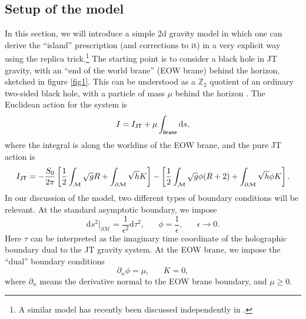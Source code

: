 \documentclass[11pt]{article}
\newcommand{\be}{\begin{equation}}
\newcommand{\ee}{\end{equation}}
\numberwithin{equation}{section}
\begin{document}
\subsection{Setup of the model}
In this section, we will introduce a simple 2d gravity model in which one can derive the ``island'' prescription (and corrections to it) in a very explicit way using the replica trick.\footnote{A similar model has recently been  discussed independently in \cite{Rozali:2019day}.} The starting point is to consider a black hole in JT gravity, with an ``end of the world brane'' (EOW brane) behind the horizon, sketched in figure \ref{fig1}. This can be understood as a $\mathbb{Z}_2$ quotient of an ordinary two-sided black hole, with a particle of mass $\mu$ behind the horizon \cite{Kourkoulou:2017zaj}. The Euclidean action for the system is
\be
 I = I_{\sf{JT}} +  \mu\int_{\sf{brane}}  \mathrm{d}s,
\ee
where the integral is along the worldine of the EOW brane, and the pure JT action is
\be\label{eq:JTaction2}
I_{\sf{JT}} = -\frac{S_0}{2\pi}\left[\frac{1}{2}\int_{\mathcal{M}}\sqrt{g}R + \int_{\partial\mathcal{M}}\sqrt{h}K\right] -\left[ \frac{1}{2}\int_{\mathcal{M}}\sqrt{g}\phi(R+2) +\int_{\partial\mathcal{M}}\sqrt{h}\phi K\right].
\ee
In our discussion of the model, two different types of boundary conditions will be relevant. At the standard asymptotic boundary, we impose
\be
\mathrm{d}s^2|_{\partial\mathcal{M}} = \frac{1}{\epsilon^2}\mathrm{d}\tau^2, \hspace{20pt} \phi = \frac{1}{\epsilon}, \hspace{20pt} \epsilon \rightarrow 0.\label{bc1}
\ee
Here $\tau$ can be interpreted as the imaginary time coordinate of the holographic boundary dual to the JT gravity system. At the EOW brane, we impose the ``dual'' boundary conditions
\be
\partial_n\phi = \mu, \hspace{20pt} K = 0,\label{bc2}
\ee
where $\partial_n$ means the derivative normal to the EOW brane boundary, and $\mu\ge 0$.
\end{document}
